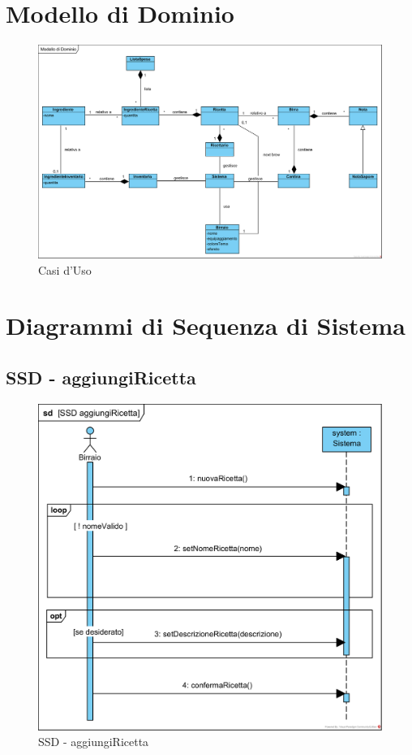 \documentclass[a4paper,12pt]{report}
\begin{document}
	\newpage	
	\section{Modello di Dominio}
	
		\begin{figure}[!h]
			\centering
			\includegraphics[width=1\linewidth]{image/Modello-di-Dominio.png}
			\caption{Casi d'Uso}\label{fig:1}
		\end{figure}

	\newpage
	\section{Diagrammi di Sequenza di Sistema}
	
		\subsection{SSD - aggiungiRicetta}
			\begin{figure}[!h]
				\centering
				\includegraphics[width=0.8\linewidth]{image/SSD-aggiungiRicetta.png}
				\caption{SSD - aggiungiRicetta}\label{fig:1}
			\end{figure}	
		\newpage	
\end{document}
